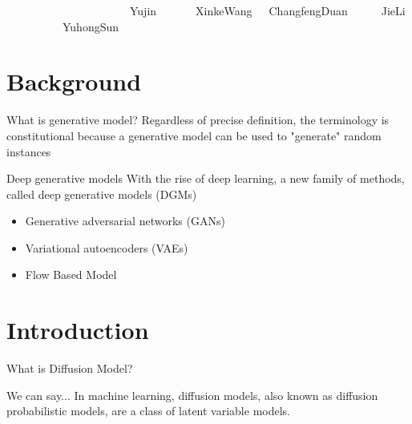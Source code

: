 \documentclass[aspectratio=169]{beamer}
\begin{document}
\begin{frame}
\begin{figure}[htbp]
{\begin{minipage}[t]{0.12\linewidth}
            \end{minipage}
        }
        \quad
    \end{figure}

    \ \ \ \ \ \ \ \ \ \ \ \ \ \ \ \ \ \ \ \ \ \
    Yujin\ \ \ \ \ \ \
    XinkeWang\ \ \
    ChangfengDuan\ \ \ \ \ \
    JieLi\ \ \ \ \ \ \ \ \ \
    YuhongSun \ \ \ \ \

\end{frame}


\section{Background}

\begin{frame}{What is generative model?}
    Regardless of precise definition, the terminology is constitutional because a generative model can be used to "generate" random instances
\end{frame}
\begin{frame}{Deep generative models}
    With the rise of deep learning, a new family of methods, called deep generative models (DGMs)
    \begin{itemize}
        \item Generative adversarial networks (GANs)
        \item Variational autoencoders (VAEs)
        \item Flow Based Model
    \end{itemize}
\end{frame}

\section{Introduction}
\begin{frame}{What is Diffusion Model?}
    \begin{block}{We can say...}
        In machine learning, diffusion models, also known as diffusion probabilistic models, are a class of latent variable models.
    \end{block}
\end{frame}
\end{document}
